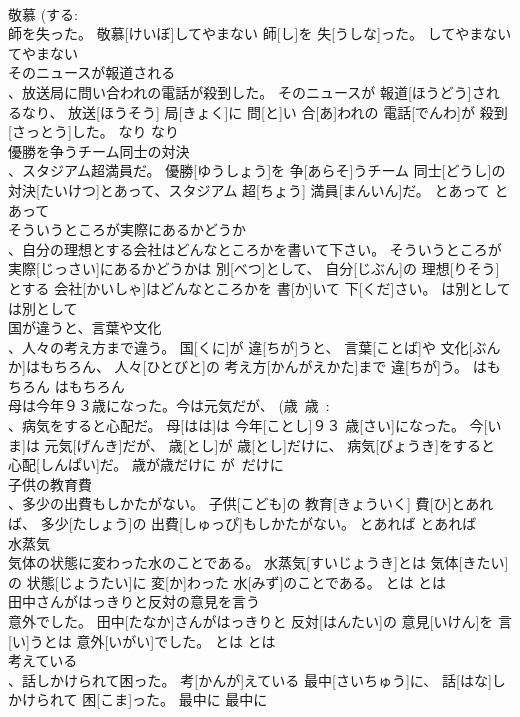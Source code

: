 \documentclass[8pt]{extreport}
\begin{document}
\begin{CJK}{UTF8}{min}
\\	敬慕 (する: 
\\	師を失った。	敬慕[けいぼ]してやまない 師[し]を 失[うしな]った。	してやまない	てやまない	
\\	そのニュースが報道される 
\\	、放送局に問い合われの電話が殺到した。	そのニュースが 報道[ほうどう]されるなり、 放送[ほうそう] 局[きょく]に 問[と]い 合[あ]われの 電話[でんわ]が 殺到[さっとう]した。	なり	なり	
\\	優勝を争うチーム同士の対決 
\\	、スタジアム超満員だ。	優勝[ゆうしょう]を 争[あらそ]うチーム 同士[どうし]の 対決[たいけつ]とあって、スタジアム 超[ちょう] 満員[まんいん]だ。	とあって	とあって	
\\	そういうところが実際にあるかどうか 
\\	、自分の理想とする会社はどんなところかを書いて下さい。	そういうところが 実際[じっさい]にあるかどうかは 別[べつ]として、 自分[じぶん]の 理想[りそう]とする 会社[かいしゃ]はどんなところかを 書[か]いて 下[くだ]さい。	は別として	は別として	
\\	国が違うと、言葉や文化 
\\	、人々の考え方まで違う。	国[くに]が 違[ちが]うと、 言葉[ことば]や 文化[ぶんか]はもちろん、 人々[ひとびと]の 考え方[かんがえかた]まで 違[ちが]う。	はもちろん	はもちろん	
\\	母は今年９３歳になった。今は元気だが、 (歳~歳~: 
\\	、病気をすると心配だ。	母[はは]は 今年[ことし]９３ 歳[さい]になった。 今[いま]は 元気[げんき]だが、 歳[とし]が 歳[とし]だけに、 病気[びょうき]をすると 心配[しんぱい]だ。	歳が歳だけに	が~だけに	
\\	子供の教育費 
\\	、多少の出費もしかたがない。	子供[こども]の 教育[きょういく] 費[ひ]とあれば、 多少[たしょう]の 出費[しゅっぴ]もしかたがない。	とあれば	とあれば	
\\	水蒸気 
\\	気体の状態に変わった水のことである。	水蒸気[すいじょうき]とは 気体[きたい]の 状態[じょうたい]に 変[か]わった 水[みず]のことである。	とは	とは	
\\	田中さんがはっきりと反対の意見を言う 
\\	意外でした。	田中[たなか]さんがはっきりと 反対[はんたい]の 意見[いけん]を 言[い]うとは 意外[いがい]でした。	とは	とは	
\\	考えている 
\\	、話しかけられて困った。	考[かんが]えている 最中[さいちゅう]に、 話[はな]しかけられて 困[こま]った。	最中に	最中に	

\end{CJK}
\end{document}

